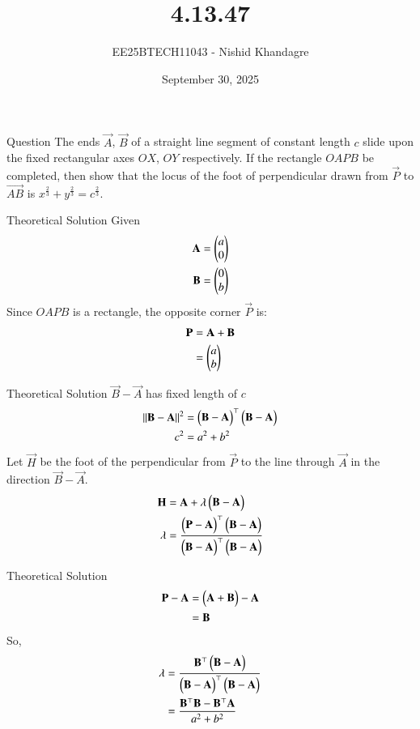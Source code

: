 \documentclass{beamer}
\title
{4.13.47}
\date{September 30, 2025}
\author
{EE25BTECH11043 - Nishid Khandagre}
\begin{document}
\frame{\titlepage}

\begin{frame}{Question}
The ends $\vec{A}$, $\vec{B}$ of a straight line segment of constant length $c$ slide upon the fixed rectangular axes $OX$, $OY$ respectively. If the rectangle $OAPB$ be completed, then show that the locus of the foot of perpendicular drawn from $\vec{P}$ to $\vec{AB}$ is $x^{\frac{2}{3}} + y^{\frac{2}{3}} = c^{\frac{2}{3}}$.
\end{frame}

\begin{frame}{Theoretical Solution}
Given
\begin{align}
\mathbf{A} &= \begin{pmatrix}a\\0\end{pmatrix} \\
\mathbf{B} &= \begin{pmatrix}0\\b\end{pmatrix}
\end{align}
Since $OAPB$ is a rectangle, the opposite corner $\vec{P}$ is:
\begin{align}
\mathbf{P} &= \mathbf{A} + \mathbf{B} \\
&= \begin{pmatrix}a \\ b\end{pmatrix}
\end{align}
\end{frame}

\begin{frame}{Theoretical Solution}
$\vec{B}-\vec{A}$ has fixed length of $c$
\begin{align}
\left\lVert\mathbf{B}-\mathbf{A}\right\rVert^2 &= \begin{pmatrix}\mathbf{B}-\mathbf{A}\end{pmatrix}^\top\begin{pmatrix}\mathbf{B}-\mathbf{A}\end{pmatrix} \\
c^2&= a^2+b^2
\end{align}
Let $\vec{H}$ be the foot of the perpendicular from $\vec{P}$ to the line through $\vec{A}$ in the direction $\vec{B}-\vec{A}$.
\begin{align}
\mathbf{H} &= \mathbf{A} + \lambda\begin{pmatrix}\mathbf{B}-\mathbf{A}\end{pmatrix} \\
\lambda &= \frac{\begin{pmatrix}\mathbf{P}-\mathbf{A}\end{pmatrix}^\top\begin{pmatrix}\mathbf{B}-\mathbf{A}\end{pmatrix}}{\begin{pmatrix}\mathbf{B}-\mathbf{A}\end{pmatrix}^\top\begin{pmatrix}\mathbf{B}-\mathbf{A}\end{pmatrix}}
\end{align}
\end{frame}

\begin{frame}{Theoretical Solution}
\begin{align}
\mathbf{P}-\mathbf{A} &= \begin{pmatrix}\mathbf{A}+\mathbf{B}\end{pmatrix}-\mathbf{A} \\
&= \mathbf{B}
\end{align}
So,
\begin{align}
\lambda &= \frac{\mathbf{B}^\top\begin{pmatrix}\mathbf{B}-\mathbf{A}\end{pmatrix}}{\begin{pmatrix}\mathbf{B}-\mathbf{A}\end{pmatrix}^\top\begin{pmatrix}\mathbf{B}-\mathbf{A}\end{pmatrix}} \\
&= \frac{\mathbf{B}^\top\mathbf{B}-\mathbf{B}^\top\mathbf{A}}{a^2+b^2}
\end{align}
\end{frame}
\end{document}

